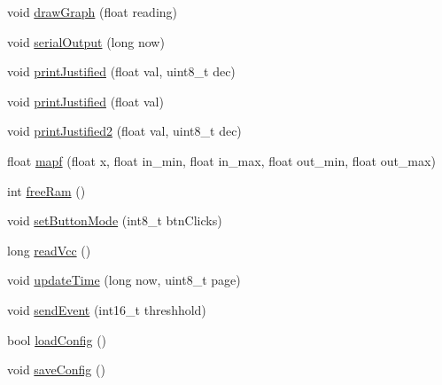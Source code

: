 \begin{DoxyCompactItemize}
\item 
void \hyperlink{_u_s_b___tester___o_l_e_d__128x64___beta__2_82_8ino_a58031557270dff55a205bc0cba647f24}{draw\+Graph} (float reading)
\item 
void \hyperlink{_u_s_b___tester___o_l_e_d__128x64___beta__2_82_8ino_a431572c740fc323bf08804590b227ea2}{serial\+Output} (long now)
\item 
void \hyperlink{_u_s_b___tester___o_l_e_d__128x64___beta__2_82_8ino_a6771f2bb498a465be30e85611dd728ad}{print\+Justified} (float val, uint8\+\_\+t dec)
\item 
void \hyperlink{_u_s_b___tester___o_l_e_d__128x64___beta__2_82_8ino_a8bcd3663872bac5388715168c9f920f9}{print\+Justified} (float val)
\item 
void \hyperlink{_u_s_b___tester___o_l_e_d__128x64___beta__2_82_8ino_a59a80ae858165fdda78ca17e168079ad}{print\+Justified2} (float val, uint8\+\_\+t dec)
\item 
float \hyperlink{_u_s_b___tester___o_l_e_d__128x64___beta__2_82_8ino_a06d59f8f94c4693a77270d804881f468}{mapf} (float x, float in\+\_\+min, float in\+\_\+max, float out\+\_\+min, float out\+\_\+max)
\item 
int \hyperlink{_u_s_b___tester___o_l_e_d__128x64___beta__2_82_8ino_aac7b29dc45caaaca67299571f6a2dcc0}{free\+Ram} ()
\item 
void \hyperlink{_u_s_b___tester___o_l_e_d__128x64___beta__2_82_8ino_a585260c6f45b8f5971f28ac53e269bfa}{set\+Button\+Mode} (int8\+\_\+t btn\+Clicks)
\item 
long \hyperlink{_u_s_b___tester___o_l_e_d__128x64___beta__2_82_8ino_a8e23c9421f6663303ea22e4969e2f6c1}{read\+Vcc} ()
\item 
void \hyperlink{_u_s_b___tester___o_l_e_d__128x64___beta__2_82_8ino_ad18e0fc055b84b24dfaf45eaf3680d43}{update\+Time} (long now, uint8\+\_\+t page)
\item 
void \hyperlink{_u_s_b___tester___o_l_e_d__128x64___beta__2_82_8ino_aca4b07e408986e89a8c9a07a64e072b6}{send\+Event} (int16\+\_\+t threshhold)
\item 
bool \hyperlink{_u_s_b___tester___o_l_e_d__128x64___beta__2_82_8ino_a391c03491ec82959f142de94af1ff7a2}{load\+Config} ()
\item 
void \hyperlink{_u_s_b___tester___o_l_e_d__128x64___beta__2_82_8ino_a688d00bbabd28fbaf9e0c50eca3adeae}{save\+Config} ()
\end{DoxyCompactItemize}
